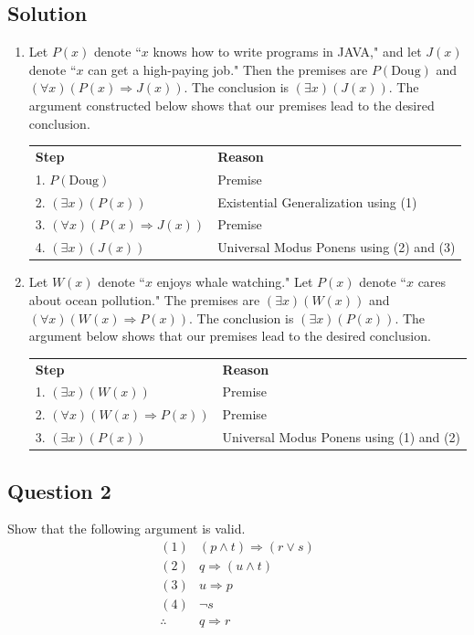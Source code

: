 \documentclass{article}
\begin{document}
\subsection*{Solution}
    \begin{enumerate}
        \item Let $P(x)$ denote ``$x$ knows how to write programs in JAVA," and let $J(x)$ denote ``$x$ can get a high-paying job." Then the premises are $P(\text{Doug})$ and $(\forall x)(P(x) \Rightarrow J(x))$. The conclusion is $(\exists x)(J(x))$. The argument constructed below shows that our premises lead to the desired conclusion.
        \begin{center}
        \begin{tabular}{ll}
            \textbf{Step} & \textbf{Reason} \\
            1. $P(\text{Doug})$ & Premise \\
            2. $(\exists x)(P(x))$ & Existential Generalization using (1) \\
            3. $(\forall x)(P(x) \Rightarrow J(x))$ & Premise \\
            4. $(\exists x)(J(x))$ & Universal Modus Ponens using (2) and (3)
        \end{tabular}
        \end{center}
        
        \item Let $W(x)$ denote ``$x$ enjoys whale watching." Let $P(x)$ denote ``$x$ cares about ocean pollution." The premises are $(\exists x)(W(x))$ and $(\forall x)(W(x) \Rightarrow P(x))$. The conclusion is $(\exists x)(P(x))$. The argument below shows that our premises lead to the desired conclusion.
        \begin{center}
        \begin{tabular}{ll}
            \textbf{Step} & \textbf{Reason} \\
            1. $(\exists x)(W(x))$ & Premise \\
            2. $(\forall x)(W(x) \Rightarrow P(x))$ & Premise \\
            3. $(\exists x)(P(x))$ & Universal Modus Ponens using (1) and (2)
        \end{tabular}
        \end{center}
    \end{enumerate}

\subsection*{Question 2}
    Show that the following argument is valid.
    $$\begin{array}{ll}
        (1) & (p \land t) \Rightarrow (r \lor s) \\
        (2) & q \Rightarrow (u \land t) \\
        (3) & u \Rightarrow p \\
        (4) & \neg s \\
        \hline
        \therefore & q \Rightarrow r
    \end{array}$$
\end{document}
